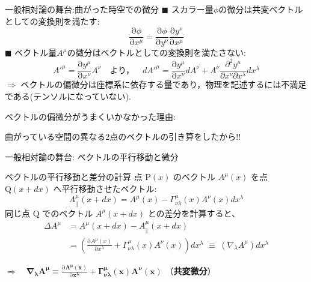 \documentclass[unicode, aspectratio=169, 12pt]{beamer}
\newcommand{\pdiff}[2]{\frac{\mathrm{\partial} #1}{\mathrm{\partial} #2}} %
\begin{document}
\begin{frame}{一般相対論の舞台:曲がった時空での微分}
    $\blacksquare$ スカラー量$\phi$の微分は共変ベクトルとしての変換則を満たす:
    \begin{equation*}
        \pdiff{\phi}{x^\mu} = \pdiff{\phi}{y^\nu}\pdiff{y^\nu}{x^\mu}
    \end{equation*}
    $\blacksquare$ ベクトル量$A^\mu$の微分はベクトルとしての変換則を満たさない:
    \begin{equation*}
        {A'}^\mu = \pdiff{y^\mu}{x^\nu}A^\nu \quad\text{より，}\quad d{A'}^\mu = \pdiff{y^\mu}{x^\nu}dA^\nu + A^\nu\frac{\partial^2 y^\mu}{\partial x^\nu \partial x^\lambda}dx^\lambda
    \end{equation*}
    $\Rightarrow$ ベクトルの偏微分は座標系に依存する量であり，物理を記述するには不満足である(テンソルになっていない).

        ベクトルの偏微分がうまくいかなかった理由:

    曲がっている空間の異なる2点のベクトルの引き算をしたから!!
\end{frame}


\begin{frame}{一般相対論の舞台: ベクトルの平行移動と微分}
    \begin{block}{ベクトルの平行移動と差分の計算}
        点 $\mathrm{P}(x)$ のベクトル $A^\mu(x)$ を点 $\mathrm{Q}(x+dx)$ へ平行移動させたベクトル:
        \begin{equation*}
            A_\parallel^\mu(x+dx) = A^\mu(x) - \Gamma^\mu_{\nu\lambda}(x) A^\nu(x) dx^\lambda
        \end{equation*}
        同じ点 $\mathrm{Q}$ でのベクトル $A^\mu(x+dx)$ との差分を計算すると、
        \begin{align*}
            \Delta A^\mu 
            &= A^\mu(x+dx) - A_\parallel^\mu(x+dx) \\
            &= \left( \pdiff{A^\mu(x)}{x^\lambda} + \Gamma^\mu_{\nu\lambda}(x) A^\nu(x) \right) dx^\lambda \;\equiv\; (\nabla_\lambda A^\mu) dx^\lambda
        \end{align*}
    \end{block}

    \vspace{0.4em}
    \centering
    $\Longrightarrow \quad \displaystyle \bm{\nabla_\lambda A^\mu \equiv \pdiff{A^\mu(x)}{x^\lambda} + \Gamma^\mu_{\nu\lambda}(x) A^\nu(x)}$ \quad （\textbf{共変微分}）
\end{frame}
\end{document}
